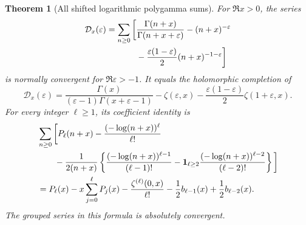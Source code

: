 \documentclass[11pt]{article}
\numberwithin{equation}{section}
\newtheorem{theorem}{Theorem}[section]
\theoremstyle{definition}\newtheorem{definition}[theorem]{Definition}
\theoremstyle{remark}\newtheorem{remark}[theorem]{Remark}
\newcommand{\Dcal}{\mathcal D}
\begin{document}
\begin{theorem}[All shifted logarithmic polygamma sums]
\label{agrc:beta-stieltjes}
For $\Re x>0$, the series
\begin{align}
 \Dcal_x(\varepsilon)=\sum_{n\geq0}\bigg[
 &\frac{\Gamma(n+x)}{\Gamma(n+x+\varepsilon)}
 -(n+x)^{-\varepsilon}\notag\\
 &-\frac{\varepsilon(1-\varepsilon)}2(n+x)^{-1-\varepsilon}\bigg]
 \label{agrc:Dx}
\end{align}
is normally convergent for $\Re\varepsilon>-1$. It equals the
holomorphic completion of
\begin{equation}\label{agrc:Dx-closed}
 \boxed{\displaystyle
 \Dcal_x(\varepsilon)=
 \frac{\Gamma(x)}{(\varepsilon-1)\Gamma(x+\varepsilon-1)}
 -\zeta(\varepsilon,x)
 -\frac{\varepsilon(1-\varepsilon)}2\zeta(1+\varepsilon,x).}
\end{equation}
For every integer $\ell\geq1$, its coefficient identity is
\begin{align}
 &\sum_{n\geq0}\bigg[P_\ell(n+x)
 -\frac{(-\log(n+x))^\ell}{\ell!}\notag\\
 &\qquad-\frac1{2(n+x)}\left\{
       \frac{(-\log(n+x))^{\ell-1}}{(\ell-1)!}
       -\mathbf1_{\ell\geq2}
          \frac{(-\log(n+x))^{\ell-2}}{(\ell-2)!}\right\}\bigg]\notag\\
 &=P_\ell(x)-x\sum_{j=0}^{\ell}P_j(x)
    -\frac{\zeta^{(\ell)}(0,x)}{\ell!}
    -\frac12 b_{\ell-1}(x)+\frac12 b_{\ell-2}(x).
 \label{agrc:all-log-sums}
\end{align}
The grouped series in this formula is absolutely convergent.
\end{theorem}
\end{document}
